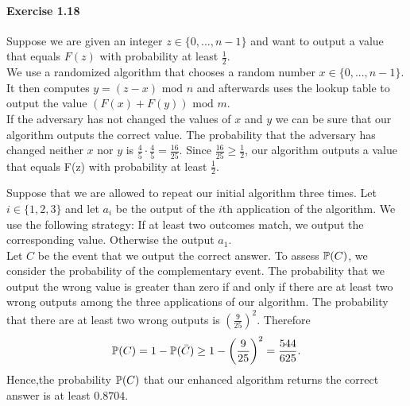 \paragraph{Exercise 1.18} Suppose we are given an integer $z \in \{ 0, ..., n-1 \}$
and want to output a value that equals $F(z)$ with probability at least
$\frac{1}{2}$. \\
We use a randomized algorithm that chooses a random number $x \in \{ 0, ..., n-1 \}$.
It then computes $y = (z - x) \text{ mod }n$ and afterwards uses the lookup table
to output the value $(F(x) + F(y)) \text{ mod }m$. \\
If the adversary has not changed the values of $x$ and $y$ we can be sure that
our algorithm outputs the correct value. The probability that the adversary has
changed neither $x$ nor $y$ is $\frac{4}{5} \cdot \frac{4}{5} = \frac{16}{25}$.
Since $\frac{16}{25} \geq \frac{1}{2}$, our algorithm outputs a value that equals
F(z) with probability at least $\frac{1}{2}$.

Suppose that we are allowed to repeat our initial algorithm three times. Let $i
\in \{ 1, 2, 3 \}$ and let $a_i$ be the output of the $i$th application of the
algorithm. We use the following strategy: If at least two outcomes match, we output
the corresponding value. Otherwise the output $a_1$.  \\
 Let $C$ be the event that we output the correct answer. To assess $\mathbb{P}(C)$, we
consider the probability of the complementary event. The probability that we
output the wrong value is greater than zero if and only if there are at least
two wrong outputs among the three applications of our algorithm. The probability
that there are at least two wrong outputs is $\left(\frac{9}{25}\right)^2$.
Therefore
\[ \mathbb{P}(C) = 1 - \mathbb{P}(\bar{C})\geq 1 - \left(\frac{9}{25}\right)^2 = \frac{544}{625}.\]
Hence,the probability $\mathbb{P}(C)$ that our enhanced algorithm returns the correct
answer is at least $0.8704$.
